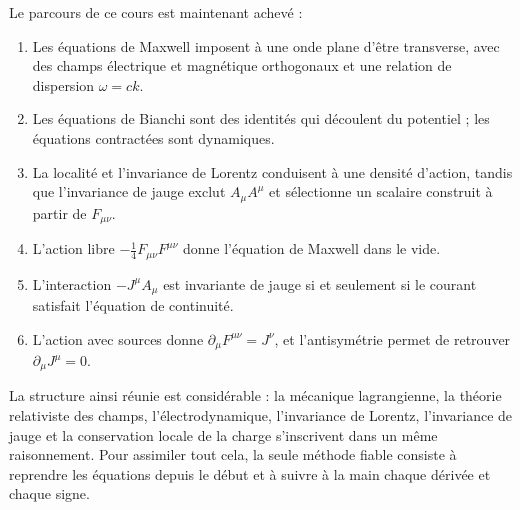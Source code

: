 Le parcours de ce cours est maintenant achevé :
\begin{enumerate}
\item Les équations de Maxwell imposent à une onde plane d’être transverse, avec des champs électrique et magnétique orthogonaux et une relation de dispersion \(\omega=ck\).
\item Les équations de Bianchi sont des identités qui découlent du potentiel ; les équations contractées sont dynamiques.
\item La localité et l’invariance de Lorentz conduisent à une densité d’action, tandis que l’invariance de jauge exclut \(A_\mu A^\mu\) et sélectionne un scalaire construit à partir de \(F_{\mu\nu}\).
\item L’action libre \(-\tfrac14F_{\mu\nu}F^{\mu\nu}\) donne l’équation de Maxwell dans le vide.
\item L’interaction \(-J^\mu A_\mu\) est invariante de jauge si et seulement si le courant satisfait l’équation de continuité.
\item L’action avec sources donne \(\partial_\mu F^{\mu\nu}=J^\nu\), et l’antisymétrie permet de retrouver \(\partial_\mu J^\mu=0\).
\end{enumerate}

La structure ainsi réunie est considérable : la mécanique lagrangienne, la théorie relativiste des champs, l’électrodynamique, l’invariance de Lorentz, l’invariance de jauge et la conservation locale de la charge s’inscrivent dans un même raisonnement. Pour assimiler tout cela, la seule méthode fiable consiste à reprendre les équations depuis le début et à suivre à la main chaque dérivée et chaque signe.